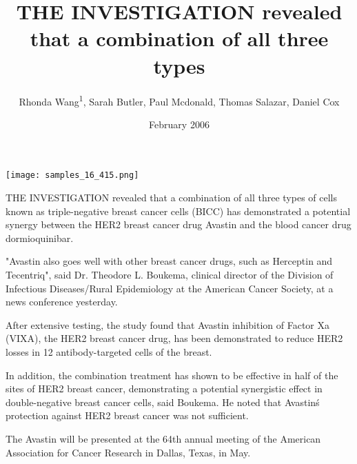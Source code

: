 \documentclass{article}
\title{THE INVESTIGATION revealed that a combination of all three types}
\author{Rhonda Wang\textsuperscript{1},  Sarah Butler,  Paul Mcdonald,  Thomas Salazar,  Daniel Cox}
\affil{\textsuperscript{1}University of Buenos Aires}
\date{February 2006}
\begin{document}
\maketitle

\begin{center}
\begin{minipage}{0.75\linewidth}
\texttt{[image: samples\_16\_415.png]}
\end{minipage}
\end{center}

THE INVESTIGATION revealed that a combination of all three types of cells known as triple-negative breast cancer cells (BICC) has demonstrated a potential synergy between the HER2 breast cancer drug Avastin and the blood cancer drug dormioquinibar.

"Avastin also goes well with other breast cancer drugs, such as Herceptin and Tecentriq", said Dr. Theodore L. Boukema, clinical director of the Division of Infectious Diseases/Rural Epidemiology at the American Cancer Society, at a news conference yesterday.

After extensive testing, the study found that Avastin inhibition of Factor Xa (VIXA), the HER2 breast cancer drug, has been demonstrated to reduce HER2 losses in 12 antibody-targeted cells of the breast.

In addition, the combination treatment has shown to be effective in half of the sites of HER2 breast cancer, demonstrating a potential synergistic effect in double-negative breast cancer cells, said Boukema. He noted that Avastin\'s protection against HER2 breast cancer was not sufficient.

The Avastin will be presented at the 64th annual meeting of the American Association for Cancer Research in Dallas, Texas, in May.
\end{document}
